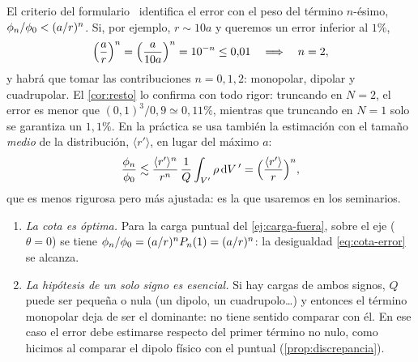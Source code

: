 \begin{observacion}\label{obs:cuantos}
El criterio del formulario~\cite{FORMULARIO} identifica el error con el peso del término $n$-ésimo, $\phi_{n}/\phi_{0}<(a/r)^{n}$. Si, por ejemplo, $r\sim10a$ y
queremos un error inferior al $1\%$,
\[
  \Bigl(\frac{a}{r}\Bigr)^{n}=\Bigl(\frac{a}{10a}\Bigr)^{n}=10^{-n}\le0{,}01\quad\Longrightarrow\quad n=2,
\]
y habrá que tomar las contribuciones $n=0,1,2$: monopolar, dipolar y cuadrupolar. El \cref{cor:resto} lo confirma con todo rigor: truncando en $N=2$, el error es menor
que $(0{,}1)^{3}/0{,}9\simeq0{,}11\%$, mientras que truncando en $N=1$ solo se garantiza un $1{,}1\%$. En la práctica se usa también la estimación con el tamaño
\emph{medio} de la distribución, $\langle r'\rangle$, en lugar del máximo $a$:
\begin{equation}\label{eq:estimacion-media}
  \frac{\phi_{n}}{\phi_{0}}\lesssim\frac{\langle r'\rangle^{n}}{r^{n}}\,\frac{1}{Q}\int_{V'}\rho\,\mathrm{d} V\,'=\Bigl(\frac{\langle r'\rangle}{r}\Bigr)^{n},
\end{equation}
que es menos rigurosa pero más ajustada: es la que usaremos en los seminarios.
\end{observacion}

\begin{observacion}\label{obs:alcance}
\begin{enumerate}[label=(\alph*)]
  \item \emph{La cota es óptima.} Para la carga puntual del \cref{ej:carga-fuera}, sobre el eje ($\theta=0$) se tiene $\phi_{n}/\phi_{0}=(a/r)^{n}P_{n}(1)=(a/r)^{n}$: la
        desigualdad \cref{eq:cota-error} se alcanza.
  \item \emph{La hipótesis de un solo signo es esencial.} Si hay cargas de ambos signos, $Q$ puede ser pequeña o nula (un dipolo, un cuadrupolo\dots) y entonces el término
        monopolar deja de ser el dominante: no tiene sentido comparar con él. En ese caso el error debe estimarse respecto del primer término no nulo, como hicimos al comparar el
        dipolo físico con el puntual (\cref{prop:discrepancia}).
\end{enumerate}
\end{observacion}
